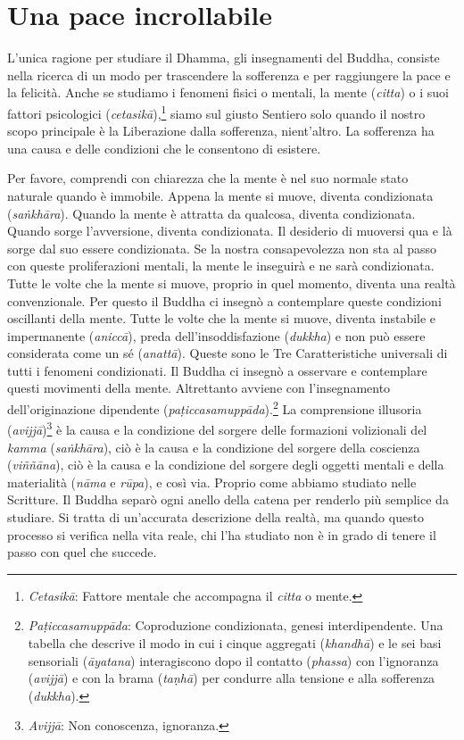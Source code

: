 \chapter{Una pace incrollabile}

L'unica ragione per studiare il Dhamma, gli insegnamenti del Buddha,
consiste nella ricerca di un modo per trascendere la sofferenza e per
raggiungere la pace e la felicità. Anche se studiamo i fenomeni fisici o
mentali, la mente (\emph{citta}) o i suoi fattori psicologici
(\emph{cetasikā}),\footnote{\emph{Cetasikā}: Fattore mentale che
  accompagna il \emph{citta} o mente.} siamo sul giusto Sentiero solo
quando il nostro scopo principale è la Liberazione dalla sofferenza,
nient'altro. La sofferenza ha una causa e delle condizioni che le
consentono di esistere.

Per favore, comprendi con chiarezza che la mente è nel suo normale stato
naturale quando è immobile. Appena la mente si muove, diventa
condizionata (\emph{saṅkhāra}). Quando la mente è attratta da qualcosa,
diventa condizionata. Quando sorge l'avversione, diventa condizionata.
Il desiderio di muoversi qua e là sorge dal suo essere condizionata. Se
la nostra consapevolezza non sta al passo con queste proliferazioni
mentali, la mente le inseguirà e ne sarà condizionata. Tutte le volte
che la mente si muove, proprio in quel momento, diventa una realtà
convenzionale. Per questo il Buddha ci insegnò a contemplare queste
condizioni oscillanti della mente. Tutte le volte che la mente si muove,
diventa instabile e impermanente (\emph{aniccā}), preda
dell'insoddisfazione (\emph{dukkha}) e non può essere considerata come
un sé (\emph{anattā}). Queste sono le Tre Caratteristiche universali di
tutti i fenomeni condizionati. Il Buddha ci insegnò a osservare e
contemplare questi movimenti della mente. Altrettanto avviene con
l'insegnamento dell'originazione dipendente
(\emph{paṭiccasamuppāda}).\footnote{\emph{Paṭiccasamuppāda}:
  Coproduzione condizionata, genesi interdipendente. Una tabella che
  descrive il modo in cui i cinque aggregati (\emph{khandhā}) e le sei
  basi sensoriali (\emph{āyatana}) interagiscono dopo il contatto
  (\emph{phassa}) con l'ignoranza (\emph{avijjā}) e con la brama
  (\emph{taṇhā}) per condurre alla tensione e alla sofferenza
  (\emph{dukkha}).} La comprensione illusoria (\emph{avijjā})\footnote{\emph{Avijjā}:
  Non conoscenza, ignoranza.} è la causa e la condizione del sorgere
delle formazioni volizionali del \emph{kamma} (\emph{saṅkhāra}), ciò è
la causa e la condizione del sorgere della coscienza (\emph{viññāna}),
ciò è la causa e la condizione del sorgere degli oggetti mentali e della
materialità (\emph{nāma} e \emph{rūpa}), e così via. Proprio come
abbiamo studiato nelle Scritture. Il Buddha separò ogni anello della
catena per renderlo più semplice da studiare. Si tratta di un'accurata
descrizione della realtà, ma quando questo processo si verifica nella
vita reale, chi l'ha studiato non è in grado di tenere il passo con quel
che succede.

